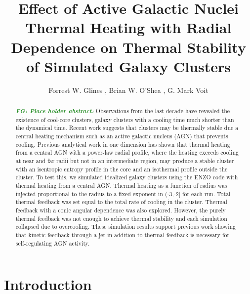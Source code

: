 \documentclass[iop,apjl, twocolappendix]{emulateapj}   %
\def\FG#1{{\textcolor{ForestGreen}{\textbf{\textit{ FG: #1}}}}}
\begin{document}
\title{Effect of Active Galactic Nuclei Thermal Heating with Radial Dependence on Thermal Stability of Simulated Galaxy Clusters}

\author{
  Forrest W. Glines , Brian W. O'Shea , G. Mark Voit
}


\label{firstpage}

\begin{abstract}
  \FG{Place holder abstract:}
  Observations from the last decade have revealed the existence of cool-core
  clusters, galaxy clusters with a cooling time  much shorter than the
  dynamical time. Recent work suggests that clusters may be thermally stable
  due a central heating mechanism such as an active galactic nucleus (AGN) that
  prevents cooling. Previous analytical work in one dimension has shown that
  thermal heating from a central AGN with a power-law radial profile, where the
  heating exceeds cooling at near and far radii but not in an intermediate
  region, may produce a stable cluster with an isentropic entropy profile in
  the core and an isothermal profile outside the cluster. To test this, we
  simulated idealized galaxy clusters using the ENZO code with thermal heating
  from a central AGN. Thermal heating as a function of radius was injected
  proportional to the radius to a fixed exponent in (-3,-2] for each run. Total
  thermal feedback was set equal to the total rate of cooling in the cluster.
  Thermal feedback with a conic angular dependence was also explored.  However,
  the purely thermal feedback was not enough to achieve thermal stability and
  each simulation collapsed due to overcooling. These simulation results
  support previous work showing that kinetic feedback through a jet in addition
  to thermal feedback is necessary for self-regulating AGN activity. 
\end{abstract}

\keywords{}

\section{Introduction}
\label{sec:introduction}
\end{document}

